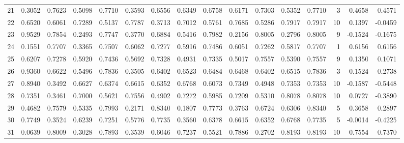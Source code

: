 \begin{tabular}{lrrrrrrrrrrrrrrr}
21  &      0.3052 &  0.7623 &  0.5098 &  0.7710 &  0.3593 &  0.6556 &  0.6349 &  0.6758 &  0.6171 &  0.7303 &   0.5352 &     0.7710 &      3 &                    0.4658 &                     0.4571 \\
22  &      0.6520 &  0.6061 &  0.7289 &  0.5137 &  0.7787 &  0.3713 &  0.7012 &  0.5761 &  0.7685 &  0.5286 &   0.7917 &     0.7917 &     10 &                    0.1397 &                    -0.0459 \\
23  &      0.9529 &  0.7854 &  0.2493 &  0.7747 &  0.3770 &  0.6884 &  0.5416 &  0.7982 &  0.2156 &  0.8005 &   0.2796 &     0.8005 &      9 &                   -0.1524 &                    -0.1675 \\
24  &      0.1551 &  0.7707 &  0.3365 &  0.7507 &  0.6062 &  0.7277 &  0.5916 &  0.7486 &  0.6051 &  0.7262 &   0.5817 &     0.7707 &      1 &                    0.6156 &                     0.6156 \\
25  &      0.6207 &  0.7278 &  0.5920 &  0.7436 &  0.5692 &  0.7328 &  0.4931 &  0.7335 &  0.5017 &  0.7557 &   0.5390 &     0.7557 &      9 &                    0.1350 &                     0.1071 \\
26  &      0.9360 &  0.6622 &  0.5496 &  0.7836 &  0.3505 &  0.6402 &  0.6523 &  0.6484 &  0.6468 &  0.6402 &   0.6515 &     0.7836 &      3 &                   -0.1524 &                    -0.2738 \\
27  &      0.8940 &  0.3492 &  0.6627 &  0.6374 &  0.6615 &  0.6352 &  0.6768 &  0.6073 &  0.7349 &  0.4948 &   0.7353 &     0.7353 &     10 &                   -0.1587 &                    -0.5448 \\
28  &      0.7351 &  0.3461 &  0.7000 &  0.5621 &  0.7556 &  0.4902 &  0.7272 &  0.5985 &  0.7209 &  0.5310 &   0.8078 &     0.8078 &     10 &                    0.0727 &                    -0.3890 \\
29  &      0.4682 &  0.7579 &  0.5335 &  0.7993 &  0.2171 &  0.8340 &  0.1807 &  0.7773 &  0.3763 &  0.6724 &   0.6306 &     0.8340 &      5 &                    0.3658 &                     0.2897 \\
30  &      0.7749 &  0.3524 &  0.6239 &  0.7251 &  0.5776 &  0.7735 &  0.3560 &  0.6378 &  0.6615 &  0.6352 &   0.6768 &     0.7735 &      5 &                   -0.0014 &                    -0.4225 \\
31  &      0.0639 &  0.8009 &  0.3028 &  0.7893 &  0.3539 &  0.6046 &  0.7237 &  0.5521 &  0.7886 &  0.2702 &   0.8193 &     0.8193 &     10 &                    0.7554 &                     0.7370 \\

\end{tabular}
